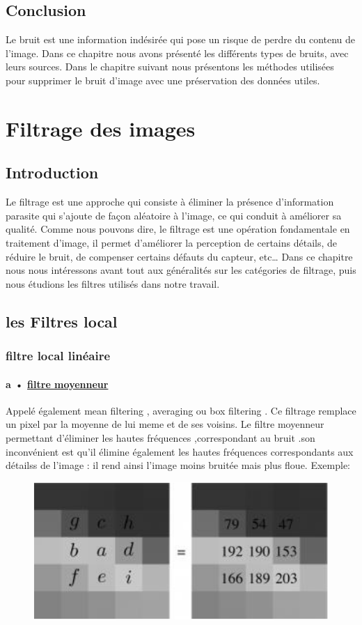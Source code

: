 \documentclass[12pt,a4paper]{report}
\numberwithin{equation}{subsection}
\numberwithin{equation}{section}
\begin{document}
\section{Conclusion}
Le bruit est une information indésirée qui pose un risque de perdre du contenu de l’image.\newline
Dans ce chapitre nous avons présenté les différents types de bruits, avec leurs
sources. \newline
Dans le chapitre suivant nous présentons les méthodes utilisées pour supprimer le bruit d’image avec une préservation des données utiles.
\chapter{Filtrage des images}
\section{Introduction}
Le filtrage est une approche qui consiste à éliminer la présence d’information parasite qui
s’ajoute de façon aléatoire à l’image, ce qui conduit à améliorer sa qualité. Comme nous pouvons
dire, le filtrage est une opération fondamentale en traitement d’image, il permet d’améliorer la
perception de certains détails, de réduire le bruit, de compenser certains défauts du capteur, etc… \newline
Dans ce chapitre nous nous intéressons avant tout aux généralités sur les catégories de
filtrage, puis nous étudions les filtres utilisés dans notre travail.

\section{ les Filtres local }
\subsection{filtre local linéaire }
\subsubsection{a • \underline {filtre moyenneur}}
Appelé également mean filtering , averaging ou box filtering .
Ce filtrage remplace un pixel par la moyenne de lui meme et de ses voisins.
\newline
 Le filtre moyenneur permettant d'éliminer les hautes fréquences ,correspondant au bruit .son inconvénient est qu'il élimine également les hautes fréquences correspondants aux détailss de l'image : il rend ainsi l'image moins bruitée mais plus floue. 
\newline
Exemple:
\begin{figure}[h!]
    \centering
    \includegraphics[width=.4\textwidth]{c.PNG}
   
    \label{fig3}
\end{figure}
\newline
\end{document}
